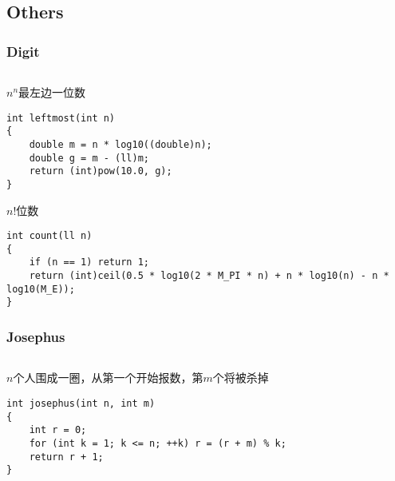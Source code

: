 \documentclass[twoside]{article}
\begin{document}
\subsection{Others}
\subsubsection{Digit}
\begin{lstlisting}
\end{lstlisting}
$n^n$最左边一位数
\begin{lstlisting}
int leftmost(int n)
{
    double m = n * log10((double)n);
    double g = m - (ll)m;
    return (int)pow(10.0, g);
}
\end{lstlisting}
$n!$位数
\begin{lstlisting}
int count(ll n)
{
    if (n == 1) return 1;
    return (int)ceil(0.5 * log10(2 * M_PI * n) + n * log10(n) - n * log10(M_E));
}
\end{lstlisting}
\subsubsection{Josephus}
\begin{lstlisting}
\end{lstlisting}
$n$个人围成一圈，从第一个开始报数，第$m$个将被杀掉
\begin{lstlisting}
int josephus(int n, int m)
{
    int r = 0;
    for (int k = 1; k <= n; ++k) r = (r + m) % k;
    return r + 1;
}
\end{lstlisting}
\end{document}
